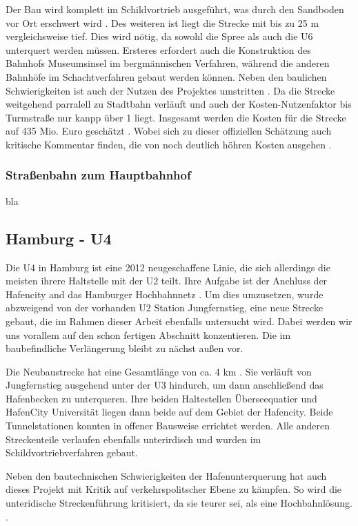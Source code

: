Der Bau wird komplett im Schildvortrieb ausgeführt, was durch den Sandboden vor
Ort erschwert wird \cite{bkhU5}. Des weiteren ist liegt die Strecke
mit bis zu 25 m vergleichsweise tief. Dies wird nötig, da sowohl die Spree als
auch die U6 unterquert werden müssen. Ersteres erfordert auch die Konstruktion
des Bahnhofs Museumsinsel im bergmännischen Verfahren, während die anderen
Bahnhöfe im Schachtverfahren gebaut werden können. Neben den baulichen
Schwierigkeiten ist auch der Nutzen des Projektes umstritten \cite{ftdU5}. Da
die Strecke weitgehend parralell zu Stadtbahn verläuft und auch der
Kosten-Nutzenfaktor bis Turmstraße nur kanpp über 1 liegt. Insgesamt werden die
Kosten für die Strecke auf 435 Mio. Euro geschätzt \cite{bwwwU5}. Wobei
sich zu dieser offiziellen Schätzung auch kritische Kommentar finden, die von
noch deutlich höhren Kosten ausgehen \cite{ftdU5}.

\subsubsection*{Straßenbahn zum Hauptbahnhof}

bla

\subsection{Hamburg - U4}

Die U4 in Hamburg ist eine 2012 neugeschaffene Linie, die sich allerdings die
meisten ihrere Haltstelle mit der U2 teilt. Ihre Aufgabe ist der Anchluss der
Hafencity and das Hamburger Hochbahnnetz \cite{keuHH}. Um dies
umzusetzen, wurde abzweigend von der vorhanden U2 Station Jungfernstieg, eine neue
Strecke gebaut, die im Rahmen dieser Arbeit ebenfalls untersucht wird. Dabei
werden wir uns vorallem auf den schon fertigen Abschnitt konzentieren. Die
im baubefindliche Verlängerung bleibt zu nächst außen vor.

Die Neubaustrecke hat eine Gesamtlänge von ca. 4 km \cite{keuHH}. Sie
verläuft von Jungfernstieg ausgehend unter der U3 hindurch, um dann anschließend
das Hafenbecken zu unterqueren. Ihre beiden Haltestellen Überseequatier und
HafenCity Universität liegen dann beide auf dem Gebiet der Hafencity. Beide
Tunnelstationen konnten in offener Bausweise errichtet werden. Alle anderen
Streckenteile verlaufen ebenfalls unterirdisch und wurden im
Schildvortriebverfahren gebaut.

Neben den bautechnischen Schwierigkeiten der Hafenunterquerung hat auch dieses
Projekt mit Kritik auf verkehrspolitscher Ebene zu kämpfen. So wird die
unteridische Streckenführung kritisiert, da sie teurer sei, als eine
Hochbahnlösung. \cite{hamburgerAbendblattu4}.

